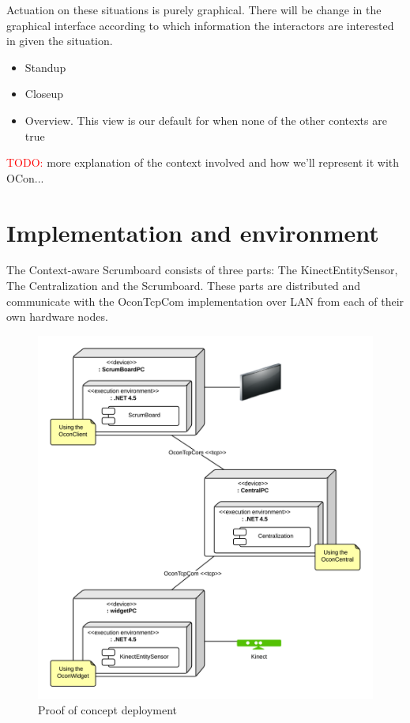 \documentclass[]{report}
\newcommand\todo[1]{\textcolor{red}{TODO: }#1\PackageWarning{TODO:}{TODO tag!!}}
\begin{document}
Actuation on these situations is purely graphical. There will be change in the graphical interface according to which information the interactors are interested in given the situation.

\begin{itemize}
\item Standup
\item Closeup
\item Overview. This view is our default for when none of the other contexts are true
\end{itemize}


\todo{more explanation of the context involved and how we'll represent it with OCon...}



\section{Implementation and environment}

The Context-aware Scrumboard consists of three parts: The KinectEntitySensor, The Centralization and the Scrumboard. These parts are distributed and communicate with the OconTcpCom implementation over LAN from each of their own hardware nodes.

\begin{figure}[H]
\includegraphics[width=\linewidth]{./ProofOfConceptDeployment.png}
\caption{Proof of concept deployment}
\label{fig:ProofofConceptDeployment}
\end{figure}
\end{document}
